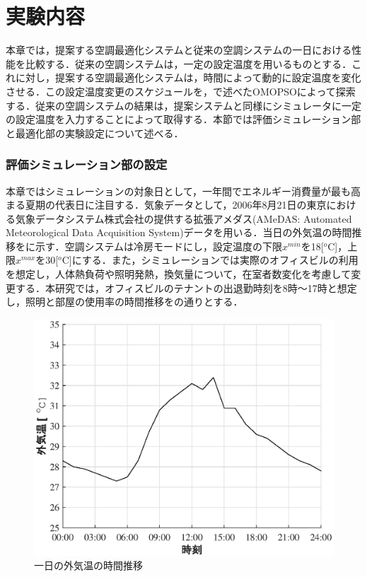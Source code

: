 \section{実験内容}\label{sec::sim_setting}
本章では，提案する空調最適化システムと従来の空調システムの一日における性能を比較する．従来の空調システムは，一定の設定温度を用いるものとする\cite{Inouye08, Kuki16}．これに対し，提案する空調最適化システムは，時間によって動的に設定温度を変化させる．この設定温度変更のスケジュールを，で述べたOMOPSOによって探索する．従来の空調システムの結果は，提案システムと同様にシミュレータに一定の設定温度を入力することによって取得する．本節では評価シミュレーション部と最適化部の実験設定について述べる．

\subsubsection{評価シミュレーション部の設定}
本章ではシミュレーションの対象日として，一年間でエネルギー消費量が最も高まる夏期の代表日に注目する．気象データとして，2006年8月21日の東京における気象データシステム株式会社の提供する拡張アメダス(AMeDAS: Automated Meteorological Data Acquisition System)データ\cite{Akasaka00}を用いる．当日の外気温の時間推移をに示す．空調システムは冷房モードにし，設定温度の下限$x^{min}$を18[$^o$C]，上限$x^{max}$を30[$^o$C]にする．また，シミュレーションでは実際のオフィスビルの利用を想定し，人体熱負荷や照明発熱，換気量について，在室者数変化を考慮して変更する．本研究では，オフィスビルのテナントの出退勤時刻を8時～17時と想定し，照明と部屋の使用率の時間推移をの通りとする．

\begin{figure}[ht]
  \begin{center}
    \includegraphics[width=0.7\linewidth]{fig/sim_outside_temp.eps}
  \end{center}
  \caption{一日の外気温の時間推移}
  \label{fig::sim_outside_temp}
\end{figure}

